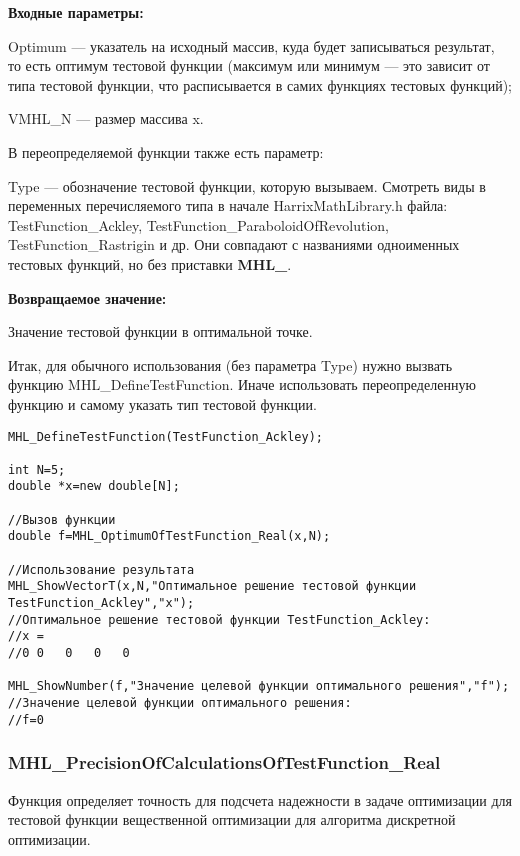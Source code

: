 \documentclass[a4paper,12pt]{article}
\begin{document}
\textbf{Входные параметры:}

Optimum --- указатель на исходный массив, куда будет записываться результат, то есть оптимум тестовой функции (максимум или минимум --- это зависит от типа тестовой функции, что расписывается в самих функциях тестовых функций);

     VMHL\_N --- размер массива x.

В переопределяемой функции также есть параметр:
  
Type --- обозначение тестовой функции, которую вызываем.
Смотреть виды в переменных перечисляемого типа в начале HarrixMathLibrary.h файла: TestFunction\_Ackley, TestFunction\_ParaboloidOfRevolution, TestFunction\_Rastrigin и др. Они совпадают с названиями одноименных тестовых функций, но без приставки \textbf{MHL\_}.

\textbf{Возвращаемое значение:}
 
Значение тестовой функции в оптимальной точке.

Итак, для обычного использования (без параметра Type) нужно вызвать функцию MHL\_DefineTestFunction. Иначе использовать переопределенную функцию и самому указать тип тестовой функции.


\begin{lstlisting}[label=code_use_MHL_OptimumOfTestFunction_Real,caption=Пример использования]
MHL_DefineTestFunction(TestFunction_Ackley);

int N=5;
double *x=new double[N];

//Вызов функции
double f=MHL_OptimumOfTestFunction_Real(x,N);

//Использование результата
MHL_ShowVectorT(x,N,"Оптимальное решение тестовой функции TestFunction_Ackley","x");
//Оптимальное решение тестовой функции TestFunction_Ackley:
//x =	
//0	0	0	0	0

MHL_ShowNumber(f,"Значение целевой функции оптимального решения","f");
//Значение целевой функции оптимального решения:
//f=0
\end{lstlisting}

\subsubsection{MHL\_PrecisionOfCalculationsOfTestFunction\_Real}\label{MHL_PrecisionOfCalculationsOfTestFunction_Real}

Функция определяет точность для подсчета надежности в задаче оптимизации для тестовой функции вещественной оптимизации для алгоритма дискретной оптимизации.
\end{document}
